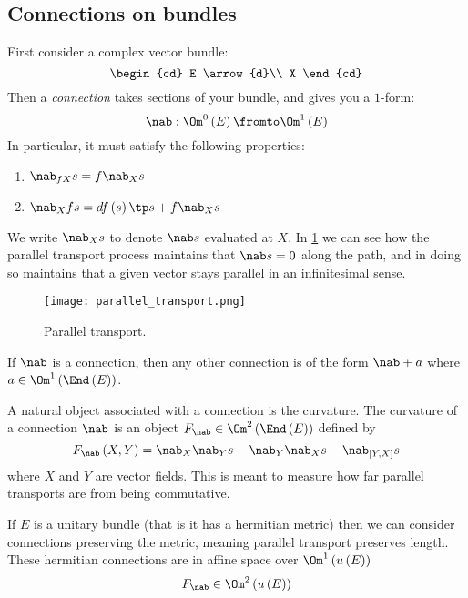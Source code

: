 \documentclass{amsart}
\begin{document}
\subsection{Connections on bundles}

First consider a complex vector bundle:
\begin{equation}
\begin{cd}
E \arrow{d}\\
X
\end{cd}
\end{equation}
Then a \emph{connection} takes sections of your bundle, and gives you a $1$-form:
\begin{equation}
\nab:
\Om^0\left( E \right) \fromto \Om^1\left( E \right)
\end{equation}
In particular, it must satisfy the following properties:
\begin{enumerate}
\item $\nab_{fX} s = f \nab_X s$
\item $\nab_X fs = df\left( s \right) \tp s + f \nab_X s$
\end{enumerate}
We write $\nab_Xs$ to denote $\nab s$ evaluated at $X$.
In \cref{fig:parallel_transport} we can see how the parallel transport process
maintains that $\nab s = 0$ along the path, and in doing so maintains that a given vector stays 
parallel in an infinitesimal sense.

\begin{figure}
\centering
\texttt{[image: parallel\_transport.png]}
\caption{Parallel transport.}
\label{fig:parallel_transport}
\end{figure}

\begin{rmk}
If $\nab$ is a connection, then any other connection is of the form 
$\nab + a$ where $a\in \Om^1\left( \End\left( E \right) \right)$.
\end{rmk}

A natural object associated with a connection is the curvature. 
The curvature of a connection $\nab$ is an object
$F_\nab \in \Om^2 \left( \End\left( E \right) \right)$
defined by
\begin{equation}
F_\nab\left( X , Y \right) = \nab_X \nab_Y s - \nab_Y \nab_X s 
- \nab_{\left[ Y , X \right]} s
\end{equation}
where $X$ and $Y$ are vector fields.
This is meant to measure how far parallel transports are from being commutative.

\begin{rmk}
If $E$ is a unitary bundle (that is it has a hermitian metric) then we can consider connections
preserving the metric, meaning parallel transport preserves length.
These hermitian connections are in affine space over $\Om^1\left( u\left( E \right) \right)$
\begin{equation}
F_\nab \in \Om^2 \left( u\left( E \right) \right)
\end{equation}
\end{rmk}
\end{document}
